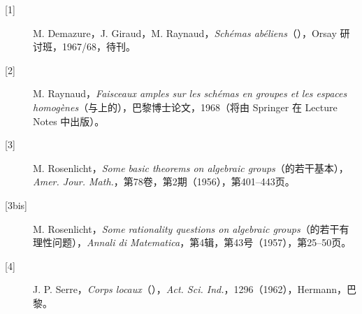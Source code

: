 \begin{description}
\item[{[1]}] M. Demazure，J. Giraud，M. Raynaud，\emph{Schémas abéliens}（），Orsay 研讨班，1967/68，待刊。
\item[{[2]}] M. Raynaud，\emph{Faisceaux amples sur les schémas en groupes et les espaces homogènes}（与上的），巴黎博士论文，1968（将由 Springer 在 Lecture Notes 中出版）。
\item[{[3]}] M. Rosenlicht，\emph{Some basic theorems on algebraic groups}（的若干基本），\emph{Amer. Jour. Math.}，第78卷，第2期（1956），第401--443页。
\item[{[3bis]}] M. Rosenlicht，\emph{Some rationality questions on algebraic groups}（的若干有理性问题），\emph{Annali di Matematica}，第4辑，第43号（1957），第25--50页。
\item[{[4]}] J. P. Serre，\emph{Corps locaux}（），\emph{Act. Sci. Ind.}，1296（1962），Hermann，巴黎。
\end{description}
